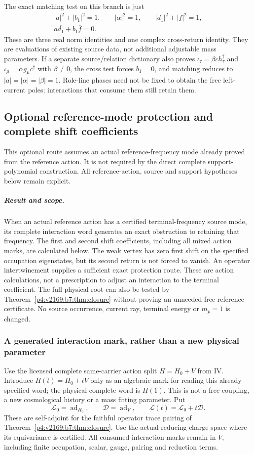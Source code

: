 \documentclass[11pt,a4paper]{article}
\begin{document}
The exact matching test on this branch is just
\[
 \boxed{\begin{gathered}
 |a|^2+|b_1|^2=1,\qquad |\alpha|^2=1,\qquad
 |d_1|^2+|f|^2=1,\\
 a\overline{d_1}+b_1\overline f=0.
 \end{gathered}}
\]
These are three real norm identities and one complex cross-return identity.
They are evaluations of existing source data, not additional adjustable
mass parameters. If a separate source/relation dictionary also proves
$\iota_\tau=\beta c h_\tau^\dagger$ and
$\iota_\mu=\alpha g_\mu c^\dagger$ with $\beta\ne0$, the cross test forces
$b_1=0$, and matching reduces to
$|a|=|\alpha|=|\beta|=1$. Role-line phases need not be fixed to obtain the
free left-current poles; interactions that consume them still retain them.






\subsection{Optional reference-mode protection and complete shift coefficients}
\label{p3f:app:v2169-pole-protection}
This optional route assumes an actual reference-frequency mode already
proved from the reference action. It is not required by the direct complete
support-polynomial construction. All reference-action, source and support
hypotheses below remain explicit.\par
\subparagraph{Result and scope.}
When an actual reference action has a certified terminal-frequency source
mode, its complete interaction word generates an exact obstruction to
retaining that frequency. The first and second shift coefficients, including
all mixed action marks, are calculated below. The weak vertex has zero first
shift on the specified occupation eigenstates, but its second return is not
forced to vanish. An operator intertwinement supplies a sufficient exact
protection route. These are action calculations, not a prescription to adjust
an interaction to the terminal coefficient. The full physical root can also
be tested by Theorem~\ref{p4:v2169:b7:thm:closure} without proving an unneeded free-reference certificate.
No source occurrence, current ray, terminal energy or $m_p=1$ is changed.

\subsubsection{A generated interaction mark, rather than a new physical parameter}
Use the licensed complete same-carrier action split $H=H_0+V$ from IV.
Introduce $H(t)=H_0+tV$ only as an algebraic mark for reading this already
specified word; the physical complete word is $H(1)$. This is not a free
coupling, a new cosmological history or a mass fitting parameter. Put
\[
 \mathcal L_0=\operatorname{ad}_{H_0},\qquad \mathcal D=\operatorname{ad}_V,
 \qquad\mathcal L(t)=\mathcal L_0+t\mathcal D.
\]
These are self-adjoint for the faithful operator trace pairing of Theorem~\ref{p4:v2169:b7:thm:closure}.
Use the actual reducing charge space where its equivariance is certified.
All consumed interaction marks remain in $V$, including finite occupation,
scalar, gauge, pairing and reduction terms.
\end{document}
